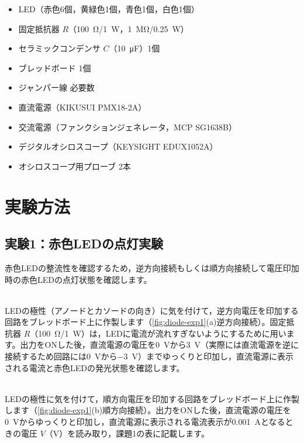 \begin{equipment}
\begin{itemize}
  \item LED（赤色6個，黄緑色1個，青色1個，白色1個）
  \item 固定抵抗器 $R$（\SI{100}{\ohm}/\SI{1}{W}，\SI{1}{\mega\ohm}/\SI{0.25}{W}）
  \item セラミックコンデンサ $C$（\SI{10}{\micro F}）1個
  \item ブレッドボード 1個
  \item ジャンパー線 必要数
  \item 直流電源（KIKUSUI PMX18-2A） 
  \item 交流電源（ファンクションジェネレータ，MCP SG1638B）
  \item デジタルオシロスコープ（KEYSIGHT EDUX1052A）
  \item オシロスコープ用プローブ 2本
\end{itemize}
\end{equipment}

\section{実験方法}

\subsection{実験1：赤色LEDの点灯実験}

赤色LEDの整流性を確認するため，逆方向接続もしくは順方向接続して電圧印加時の赤色LEDの点灯状態を確認します。

\begin{procedure}[label=\textbf{(\alph*)}]
  \item {}\\
    LEDの極性（アノードとカソードの向き）に気を付けて，逆方向電圧を印加する回路をブレッドボード上に作製します（\cref{fig:diode-exp1}(a)逆方向接続）。固定抵抗器 $R$（\SI{100}{\ohm}/\SI{1}{W}）は，LEDに電流が流れすぎないようにするために用います。出力をONした後，直流電源の電圧を\SI{0}{V}から\SI{3}{V}（実際には直流電源を逆に接続するため回路には\SI{0}{V}から\SI{-3}{V}）までゆっくりと印加し，直流電源に表示される電流と赤色LEDの発光状態を確認します。
  \item {}\\
    LEDの極性に気を付けて，順方向電圧を印加する回路をブレッドボード上に作製します（\cref{fig:diode-exp1}(b)順方向接続）。出力をONした後，直流電源の電圧を\SI{0}{V}からゆっくりと印加し，直流電源に表示される電流表示が\SI{0.001}{A}となるときの電圧 $V$（V）を読み取り，課題1の表に記載します。
\end{procedure}

